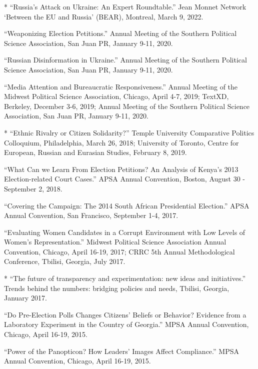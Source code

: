 {* ``Russia's Attack on Ukraine: An Expert Roundtable.'' Jean Monnet Network `Between the EU and Russia' (BEAR), Montreal, March 9, 2022.

``Weaponizing Election Petitions.'' Annual Meeting of the Southern Political Science Association, San Juan PR, January 9-11, 2020.

``Russian Disinformation in Ukraine.'' Annual Meeting of the Southern Political Science Association, San Juan PR, January 9-11, 2020.

``Media Attention and Bureaucratic Responsiveness.'' Annual Meeting of the Midwest Political Science Association, Chicago, April 4-7, 2019; TextXD, Berkeley, December 3-6, 2019; Annual Meeting of the Southern Political Science Association, San Juan PR, January 9-11, 2020.

* ``Ethnic Rivalry or Citizen Solidarity?'' Temple University Comparative Politics Colloquium, Philadelphia, March 26, 2018; University of Toronto, Centre for European, Russian and Eurasian Studies, February 8, 2019.

``What Can we Learn From Election Petitions? An Analysis of Kenya's 2013 Election-related Court Cases.'' APSA Annual Convention, Boston, August 30 - September 2, 2018.

``Covering the Campaign: The 2014 South African Presidential Election.'' APSA Annual Convention, San Francisco, September 1-4, 2017.

``Evaluating Women Candidates in a Corrupt Environment with Low Levels of Women's Representation.'' Midwest Political Science Association Annual Convention, Chicago, April 16-19, 2017; CRRC 5th Annual Methodological Conference, Tbilisi, Georgia, July 2017.

* ``The future of transparency and experimentation: new ideas and initiatives.'' Trends behind the numbers: bridging policies and needs, Tbilisi, Georgia, January 2017.

``Do Pre-Election Polls Changes Citizens' Beliefs or Behavior? Evidence from a Laboratory Experiment in the Country of Georgia.'' MPSA Annual Convention, Chicago, April 16-19, 2015.

``Power of the Panopticon? How Leaders' Images Affect Compliance.'' MPSA Annual Convention, Chicago, April 16-19, 2015.
}

